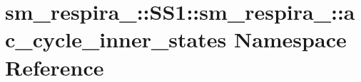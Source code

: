 \hypertarget{namespacesm__respira__1_1_1SS1_1_1sm__respira__1_1_1ac__cycle__inner__states}{}\section{sm\+\_\+respira\+\_\+:\+:S\+S1\+:\+:sm\+\_\+respira\+\_\+:\+:ac\+\_\+cycle\+\_\+inner\+\_\+states Namespace Reference}
\label{namespacesm__respira__1_1_1SS1_1_1sm__respira__1_1_1ac__cycle__inner__states}
